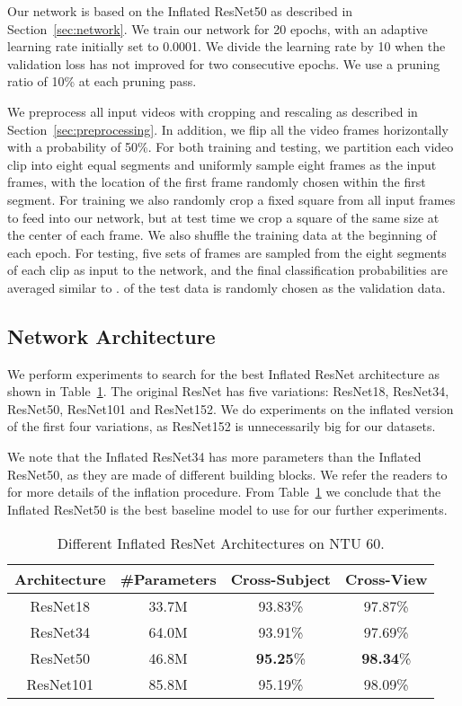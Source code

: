 \documentclass{article}
\begin{document}
{Our network is based on the Inflated ResNet50 as described in Section~\ref{sec:network}. We train our network for 20 epochs, with an adaptive learning rate initially set to 0.0001. We divide the learning rate by 10 when the validation loss has not improved for two consecutive epochs. We use a pruning ratio of 10\% at each pruning pass.}

{We preprocess all input videos with cropping and rescaling as described in Section~\ref{sec:preprocessing}. In addition, we flip all the video frames horizontally with a probability of 50\%. For both training and testing, we partition each video clip into eight equal segments and uniformly sample eight frames as the input frames, with the location of the first frame randomly chosen within the first segment. For training we also randomly crop a fixed  square from all input frames to feed into our network, but at test time we crop a square of the same size at the center of each frame. We also shuffle the training data at the beginning of each epoch. For testing, five sets of frames are sampled from the eight segments of each clip as input to the network, and the final classification probabilities are averaged similar to \cite{Baradel_2018}.  of the test data is randomly chosen as the validation data.} 

\subsection{Network Architecture}
\label{sec:resnet}
{We perform experiments to search for the best Inflated ResNet architecture as shown in Table~\ref{tbl:Inflated_architecture_comparison}. The original ResNet has five variations: ResNet18, ResNet34, ResNet50, ResNet101 and ResNet152. We do experiments on the inflated version of the first four variations, as ResNet152 is unnecessarily big for our datasets.}

{We note that the Inflated ResNet34 has more parameters than the Inflated ResNet50, as they are made of different building blocks. We refer the readers to \cite{carreira2017quo} for more details of the inflation procedure. From Table~\ref{tbl:Inflated_architecture_comparison} we conclude that the Inflated ResNet50 is the best baseline model to use for our further experiments.}

\begin{table}
\begin{center}
\caption{Different Inflated ResNet Architectures on NTU 60.}
\label{tbl:Inflated_architecture_comparison}
\begin{tabular}{|c|c|c|c|}
\hline
Architecture & \#Parameters& Cross-Subject & Cross-View\\
\hline
ResNet18 & 33.7M & 93.83\% & 97.87\%\\
ResNet34 & 64.0M & 93.91\% & 97.69\%\\
ResNet50 & 46.8M & \textbf{95.25}\% & \textbf{98.34}\%\\
ResNet101 & 85.8M & 95.19\% & 98.09\%\\
\hline

\end{tabular}
\end{center}
\end{table}
\end{document}
